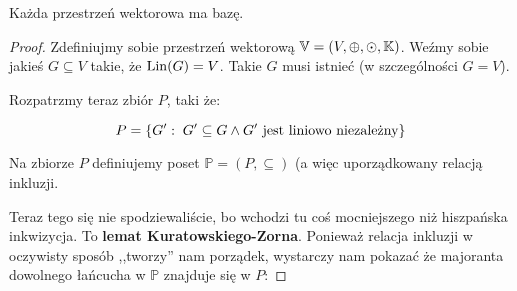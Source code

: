 \begin{theorem}
Każda przestrzeń wektorowa ma bazę.
\end{theorem}
\begin{proof}
    Zdefiniujmy sobie przestrzeń wektorową \( \mathbb{V} = (V, \oplus, \odot, \mathbb{K})\). Weźmy sobie jakieś \( G \subseteq V \) takie, że \({\mathrm{Lin}}(G) = V\). Takie \(G\) musi istnieć (w szczególności \(G = V\)). 
    
    Rozpatrzmy teraz zbiór \(P\), taki że:
    
    \[
        P = \set{G': \; G' \subseteq G \land \text{\(G'\) jest liniowo niezależny}}
    \]
    
    Na zbiorze \(P\) definiujemy poset \( \mathbb{P} = (P, \subseteq)\) (a więc uporządkowany relacją inkluzji.
    
    Teraz tego się nie spodziewaliście, bo wchodzi tu coś mocniejszego niż hiszpańska inkwizycja. To \textbf{lemat Kuratowskiego-Zorna}. Ponieważ relacja inkluzji w oczywisty sposób ,,tworzy'' nam porządek, wystarczy nam pokazać że majoranta dowolnego łańcucha w \(\mathbb{P}\) znajduje się w \(P\):
    

\end{proof}
